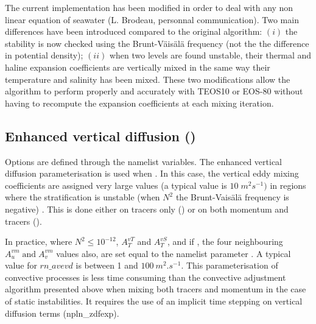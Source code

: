\documentclass[../main/NEMO_manual]{subfiles}
\begin{document}
The current implementation has been modified in order to deal with any non linear equation of seawater
(L. Brodeau, personnal communication).
Two main differences have been introduced compared to the original algorithm:
$(i)$ the stability is now checked using the Brunt-V\"{a}is\"{a}l\"{a} frequency 
(not the the difference in potential density); 
$(ii)$ when two levels are found unstable, their thermal and haline expansion coefficients are vertically mixed in
the same way their temperature and salinity has been mixed.
These two modifications allow the algorithm to perform properly and accurately with TEOS10 or EOS-80 without
having to recompute the expansion coefficients at each mixing iteration.

\subsection{Enhanced vertical diffusion (\protect{})}
\label{subsec:ZDF_evd}



Options are defined through the   namelist variables.
The enhanced vertical diffusion parameterisation is used when .
In this case, the vertical eddy mixing coefficients are assigned very large values
(a typical value is $10\;m^2s^{-1})$ in regions where the stratification is unstable
(\ie when $N^2$ the Brunt-Vais\"{a}l\"{a} frequency is negative) \citep{Lazar_PhD97, Lazar_al_JPO99}.
This is done either on tracers only () or
on both momentum and tracers ().

In practice, where $N^2\leq 10^{-12}$, $A_T^{vT}$ and $A_T^{vS}$, and if ,
the four neighbouring $A_u^{vm} \;\mbox{and}\;A_v^{vm}$ values also, are set equal to
the namelist parameter .
A typical value for $rn\_avevd$ is between 1 and $100~m^2.s^{-1}$.
This parameterisation of convective processes is less time consuming than
the convective adjustment algorithm presented above when mixing both tracers and
momentum in the case of static instabilities.
It requires the use of an implicit time stepping on vertical diffusion terms
(\ie np{ln\_zdfexp}).
\end{document}
